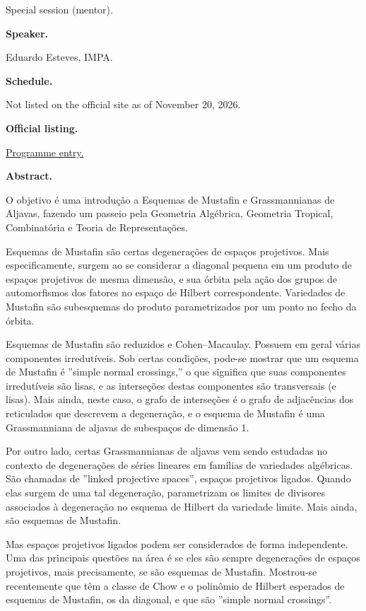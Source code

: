 Special session (mentor).

\medskip\noindent
{\bf Speaker.}

Eduardo Esteves, IMPA.

\medskip\noindent
{\bf Schedule.}

Not listed on the official site as of
November 20, 2026.

\medskip\noindent
{\bf Official listing.}

\href{%
https://sites.google.com/view/%
geoalgcompluff/legal/%
legal-2027-resumos#h.6f5k7zdb7c47%
}{Programme entry.}

\medskip\noindent
{\bf Abstract.}

O objetivo é uma introdução a Esquemas de
Mustafin e Grassmannianas de Aljavas, fazendo
um passeio pela Geometria Algébrica,
Geometria Tropical, Combinatória e Teoria de
Representações.

Esquemas de Mustafin são certas degenerações
de espaços projetivos. Mais especificamente,
surgem ao se considerar a diagonal pequena em
um produto de espaços projetivos de mesma
dimensão, e sua órbita pela ação dos grupos
de automorfismos dos fatores no espaço de
Hilbert correspondente. Variedades de
Mustafin são subesquemas do produto
parametrizados por um ponto no fecho da
órbita.

Esquemas de Mustafin são reduzidos e
Cohen–Macaulay. Possuem em geral várias
componentes irredutíveis. Sob certas
condições, pode-se mostrar que um esquema de
Mustafin é ”simple normal crossings,” o que
significa que suas componentes irredutíveis
são lisas, e as interseções destas
componentes são transversais (e lisas). Mais
ainda, neste caso, o grafo de interseções é o
grafo de adjacências dos reticulados que
descrevem a degeneração, e o esquema de
Mustafin é uma Grassmanniana de aljavas de
subespaços de dimensão 1.

Por outro lado, certas Grassmannianas de
aljavas vem sendo estudadas no contexto de
degenerações de séries lineares em famílias
de variedades algébricas. São chamadas de
”linked projective spaces”, espaços
projetivos ligados. Quando elas surgem de uma
tal degeneração, parametrizam os limites de
divisores associados à degeneração no esquema
de Hilbert da variedade limite. Mais ainda,
são esquemas de Mustafin.

Mas espaços projetivos ligados podem ser
considerados de forma independente. Uma das
principais questões na área é se eles são
sempre degenerações de espaços projetivos,
mais precisamente, se são esquemas de
Mustafin. Mostrou-se recentemente que têm a
classe de Chow e o polinômio de Hilbert
esperados de esquemas de Mustafin, os da
diagonal, e que são ”simple normal
crossings”.

